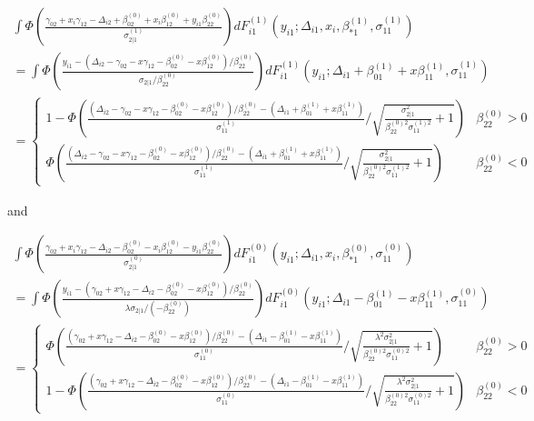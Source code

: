 \documentclass[12pt]{article}
\begin{document}
\begin{enumerate}
\begin{align*}
\int \Phi \left( \frac{\gamma_{02} + x_i\gamma_{12} - \Delta_{i2} + \beta_{02}^{(0)} + x_i\beta_{12}^{(0)} + y_{i1}\beta_{22}^{(0)}}{\sigma_{2|1}^{(1)}} \right) dF_{i1}^{(1)}(y_{i1}; \Delta_{i1}, x_i, \beta_{*1}^{(1)}, \sigma_{11}^{(1)}) \\
= \int \Phi \left( \frac{y_{i1} - (\Delta_{i2} - \gamma_{02} - x \gamma_{12} - \beta_{02}^{(0)} - x\beta_{12}^{(0)})/\beta_{22}^{(0)}}{\sigma_{2|1}/\beta_{22}^{(0)}} \right) dF_{i1}^{(1)}(y_{i1}; \Delta_{i1}+\beta_{01}^{(1)} + x\beta_{11}^{(1)}, \sigma_{11}^{(1)}) \\
 = 
\begin{cases}
1 - \Phi \left( \frac{(\Delta_{i2} - \gamma_{02} - x \gamma_{12} - \beta_{02}^{(0)} - x\beta_{12}^{(0)})/\beta_{22}^{(0)} - (\Delta_{i1}+\beta_{01}^{(1)} + x\beta_{11}^{(1)}) }{\sigma_{11}^{(1)}} / \sqrt{\frac{\sigma_{2|1}^2}{\beta_{22}^{(0)2} \sigma_{11}^{(1)2}} +1} \right) & \beta_{22}^{(0)} > 0\\
\Phi \left( \frac{(\Delta_{i2} - \gamma_{02} - x \gamma_{12} - \beta_{02}^{(0)} - x\beta_{12}^{(0)})/\beta_{22}^{(0)} - (\Delta_{i1}+\beta_{01}^{(1)} + x\beta_{11}^{(1)}) }{\sigma_{11}^{(1)}} / \sqrt{\frac{\sigma_{2|1}^2}{\beta_{22}^{(0)2} \sigma_{11}^{(1)2}} +1} \right)& \beta_{22}^{(0)} < 0 
\end{cases}
\end{align*}

and 

\begin{align*}
\int \Phi \left( \frac{\gamma_{02} + x_i\gamma_{12} - \Delta_{i2} - \beta_{02}^{(0)} - x_i\beta_{12}^{(0)} - y_{i1}\beta_{22}^{(0)}}{\sigma_{2|1}^{(0)}} \right) dF_{i1}^{(0)}(y_{i1}; \Delta_{i1}, x_i, \beta_{*1}^{(0)}, \sigma_{11}^{(0)}) \\
= \int \Phi \left( \frac{y_{i1} - ( \gamma_{02} + x \gamma_{12} - \Delta_{i2} - \beta_{02}^{(0)} - x\beta_{12}^{(0)})/\beta_{22}^{(0)}}{\lambda\sigma_{2|1}/(-\beta_{22}^{(0)})} \right) dF_{i1}^{(0)}(y_{i1}; \Delta_{i1}-\beta_{01}^{(1)} - x\beta_{11}^{(1)}, \sigma_{11}^{(0)}) \\
 = 
\begin{cases}
\Phi \left( \frac{( \gamma_{02} + x \gamma_{12} - \Delta_{i2}  - \beta_{02}^{(0)} - x\beta_{12}^{(0)})/\beta_{22}^{(0)} - (\Delta_{i1} - \beta_{01}^{(1)} - x\beta_{11}^{(1)}) }{\sigma_{11}^{(0)}} / \sqrt{\frac{\lambda^{2}\sigma_{2|1}^2}{\beta_{22}^{(0)2} \sigma_{11}^{(0)2}} +1} \right) & \beta_{22}^{(0)} > 0\\
1 - \Phi \left( \frac{( \gamma_{02} +  x \gamma_{12} - \Delta_{i2}  - \beta_{02}^{(0)} - x\beta_{12}^{(0)})/\beta_{22}^{(0)} - (\Delta_{i1} - \beta_{01}^{(1)} - x\beta_{11}^{(1)}) }{\sigma_{11}^{(0)}} / \sqrt{\frac{\lambda^2\sigma_{2|1}^2}{\beta_{22}^{(0)2} \sigma_{11}^{(0)2}} +1} \right)& \beta_{22}^{(0)} < 0 
\end{cases}
\end{align*}


\end{enumerate}
\end{document}
